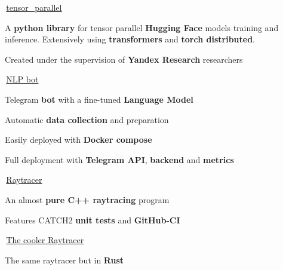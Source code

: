 
\begin{cventries}
  \cventry
    {} %
    {\,\faGithub\acvHeaderIconSep\href{https://github.com/BlackSamorez/tensor_parallel}{tensor\_parallel}} %
    {} %
    {} %
    {
      \begin{cvitems} %
        \item {A \textbf{python library} for tensor parallel \textbf{Hugging Face} models training and inference. Extensively using \textbf{transformers} and \textbf{torch distributed}.}
        \item {Created under the supervision of \textbf{Yandex Research} researchers}
      \end{cvitems}
    }
    
  \cventry
    {} %
    {\,\faGithub\acvHeaderIconSep\href{https://github.com/BlackSamorez/ebanko}{NLP bot}} %
    {} %
    {} %
    {
      \begin{cvitems} %
        \item {Telegram \textbf{bot} with a fine-tuned \textbf{Language Model}}
        \item {Automatic \textbf{data collection} and preparation}
        \item {Easily deployed with \textbf{Docker compose}}
		\item {Full deployment with \textbf{Telegram API}, \textbf{backend} and \textbf{metrics}}
      \end{cvitems}
    }
    
  \cventry
    {} %
    {\,\faGithub\acvHeaderIconSep\href{https://github.com/BlackSamorez/raytracer21}{Raytracer}} %
    {} %
    {} %
    {
      \begin{cvitems} %
        \item {An almost \textbf{pure C++ raytracing} program}
		\item {Features CATCH2 \textbf{unit tests} and \textbf{GitHub-CI}}
      \end{cvitems}
    }

  \cventry
    {} %
    {\,\faGithub\acvHeaderIconSep\href{https://github.com/BlackSamorez/raytracer22}{The cooler Raytracer}} %
    {} %
    {} %
    {
      \begin{cvitems} %
        \item {The same raytracer but in \textbf{Rust}}
      \end{cvitems}
    }
    

\end{cventries}
